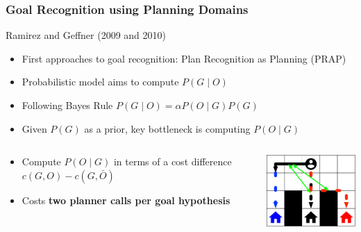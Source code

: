 \documentclass[usenames,dvipsnames]{beamer}
\begin{document}
\begin{frame}[c,allowframebreaks]\frametitle{Goal Recognition using Planning Domains}
	
	Ramirez and Geffner (2009 and 2010)
	\begin{itemize}
		\item First approaches to goal recognition: Plan Recognition as Planning (PRAP)
		\item Probabilistic model aims to compute $P(G \mid O)$
		\item Following Bayes Rule $P(G \mid O) = \alpha P(O \mid G) P(G)$
		\item Given $P(G)$ as a prior, key bottleneck is computing $P(O \mid G)$
	\end{itemize}
	\begin{columns}
		\begin{column}{.5\textwidth}
			\begin{itemize}
				\normalsize
				\item Compute $P(O \mid G)$ in terms of a cost difference $c(G,O) - c(G,\bar{O})$
				\item Costs \textbf{two planner calls per goal hypothesis}
			\end{itemize}
		\end{column}
		\begin{column}{.5\textwidth}
			\begin{center}
				\includegraphics[width=12em]{fig/gr-approaches/gr-ramirez.pdf}
			\end{center}
		\end{column}
	\end{columns}
\end{frame}
\end{document}
